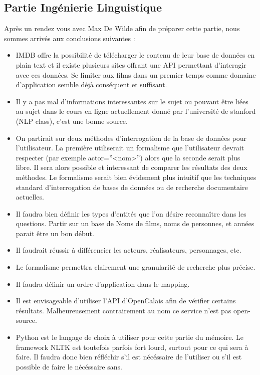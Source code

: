 \documentclass[11pt]{article}
\begin{document}
\subsection{Partie Ingénierie Linguistique}
Après un rendez vous avec Max De Wilde afin de préparer cette partie, nous sommes arrivés aux conclusions suivantes :
\begin{itemize}
  \item IMDB offre la possibilité de télécharger le contenu de leur base de données en plain text et il existe plusieurs sites offrant une API permettant d'interagir avec ces données. Se limiter aux films dans un premier temps comme domaine d'application semble déjà conséquent et suffisant.
  \item Il y a pas mal d'informations interessantes sur le sujet ou pouvant être liées au sujet dans le cours en ligne actuellement donné par l'université de stanford (NLP class), c'est une bonne source.
  \item On partirait sur deux méthodes d'interrogation de la base de données pour l'utilisateur. La première utiliserait un formalisme que l'utilisateur devrait respecter (par exemple actor=''<nom>'') alors que la seconde serait plus libre. Il sera alors possible et interessant de comparer les résultats des deux méthodes. Le formalisme serait bien évidement plus intuitif que les techniques standard d'interrogation de bases de données ou de recherche documentaire actuelles.
  \item Il faudra bien définir les types d'entités que l'on désire reconnaître dans les questions. Partir sur un base de Noms de films, noms de personnes, et années parait être un bon début.
  \item Il faudrait réussir à différencier les acteurs, réalisateurs, personnages, etc.
  \item Le formalisme permettra clairement une granularité de recherche plus précise.
  \item Il faudra définir un ordre d'application dans le mapping.
  \item Il est envisageable d'utiliser l'API d'OpenCalais afin de vérifier certains résultats. Malheureusement contrairement au nom ce service n'est pas open-source.
  \item Python est le langage de choix à utiliser pour cette partie du mémoire. Le framework NLTK est toutefois parfois fort lourd, surtout pour ce qui sera à faire. Il faudra donc bien réfléchir s'il est nécéssaire de l'utiliser ou s'il est possible de faire le nécéssaire sans.
\end{itemize}
\end{document}
